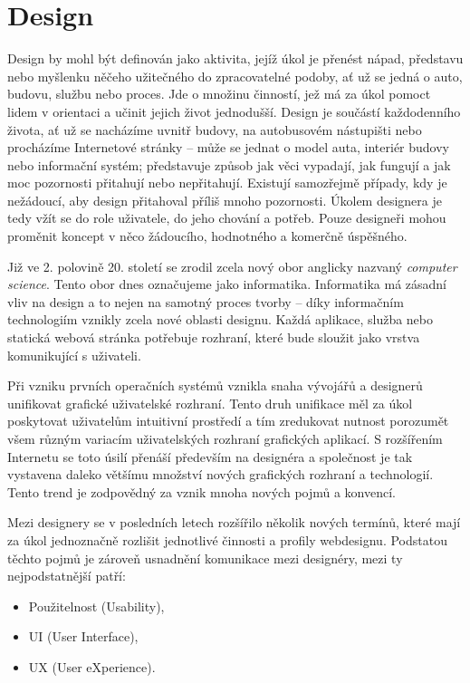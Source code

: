 \chapter{Design}
\label{chap:design}

Design by mohl být definován jako aktivita, jejíž úkol je přenést nápad, představu nebo myšlenku něčeho užitečného do zpracovatelné podoby, ať už se jedná o auto, budovu, službu nebo proces. Jde o množinu činností, jež má za úkol pomoct lidem v orientaci a učinit jejich život jednodušší. Design je součástí každodenního života, ať už se nacházíme uvnitř budovy, na autobusovém nástupišti nebo procházíme Internetové stránky -- může se jednat o model auta, interiér budovy nebo informační systém; představuje způsob jak věci vypadají, jak fungují a jak moc pozornosti přitahují nebo nepřitahují. Existují samozřejmě případy, kdy je nežádoucí, aby design přitahoval příliš mnoho pozornosti. Úkolem designera je tedy vžít se do role uživatele, do jeho chování a potřeb. Pouze designeři mohou proměnit koncept v něco žádoucího, hodnotného a komerčně úspěšného.

Již ve 2. polovině 20. století se zrodil zcela nový obor anglicky nazvaný \textit{computer science}. Tento obor dnes označujeme jako informatika. Informatika má zásadní vliv na design a to nejen na samotný proces tvorby -- díky informačním technologiím vznikly zcela nové oblasti designu. Každá aplikace, služba nebo statická webová stránka potřebuje rozhraní, které bude sloužit jako vrstva komunikující s uživateli.

Při vzniku prvních operačních systémů vznikla snaha vývojářů a designerů unifikovat grafické uživatelské rozhraní. Tento druh unifikace měl za úkol poskytovat uživatelům intuitivní prostředí a tím zredukovat nutnost porozumět všem různým variacím uživatelských rozhraní grafických aplikací. S rozšířením Internetu se toto úsilí přenáší především na designéra a společnost je tak vystavena daleko většímu množství nových grafických rozhraní a technologií. Tento trend je zodpovědný za vznik mnoha nových pojmů a konvencí.

Mezi designery se v posledních letech rozšířilo několik nových termínů, které mají za úkol jednoznačně rozlišit jednotlivé činnosti a profily webdesignu. Podstatou těchto pojmů je zároveň usnadnění komunikace mezi designéry, mezi ty nejpodstatnější patří:

\begin{itemize}
    \item Použitelnost (Usability),
    \item UI (User Interface),
    \item UX (User eXperience).
\end{itemize}

